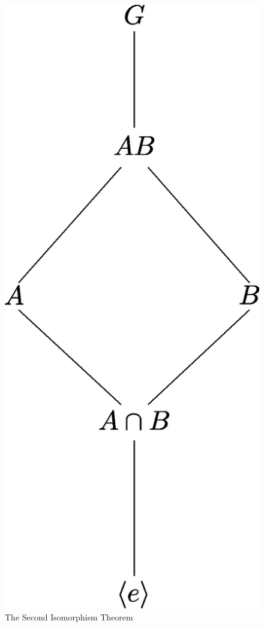 \begin{figure}[h]
    \centering
    \includegraphics[scale = 0.3]{Figures/Chapter3/second_iso_thm.eps}
    \caption{The Second Isomorphism Theorem}
    \label{fig_3.3}
\end{figure}

